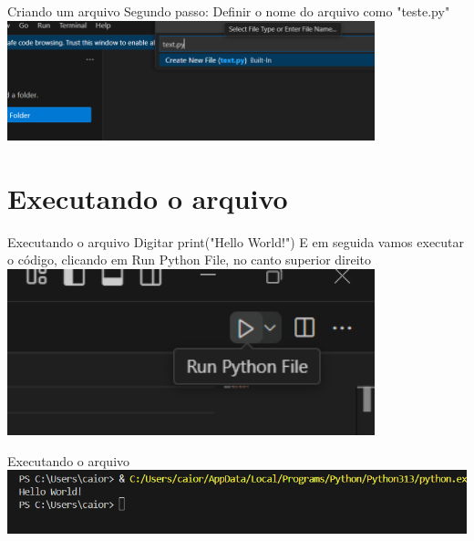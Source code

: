 \documentclass[fleqn,utf8,aspectratio=169,14pt]{beamer}
\begin{document}
	\begin{frame}{Criando um arquivo}
		Segundo passo:
		Definir o nome do arquivo como "teste.py"
		\centering %
		\includegraphics[width=0.8\textwidth]{Imagem2.png}
	\end{frame}
	
	\section{Executando o arquivo}
	\begin{frame}{Executando o arquivo}
		Digitar print("Hello World!")
		E em seguida vamos executar o código, clicando em Run Python File, no canto superior direito
		\centering %
		\includegraphics[width=0.8\textwidth]{Imagem3.png}
	\end{frame}
	
	
	\begin{frame}{Executando o arquivo}
		\centering %
		\includegraphics[width=1.2\textwidth]{Imagem4.png}
	\end{frame}
	
\end{document}
